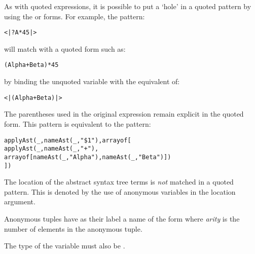 As with quoted expressions, it is possible to put a `hole' in a quoted pattern by using the  or  forms. For example, the pattern:
\begin{alltt}
<| ?A * 45 |>
\end{alltt}
will match with a quoted form such as:
\begin{alltt}
(Alpha+Beta)*45
\end{alltt}
by binding the unquoted variable  with the equivalent of:
\begin{alltt}
<| (Alpha+Beta) |>
\end{alltt}
\begin{aside}
The parentheses used in the original expression remain explicit in the quoted form. This pattern is equivalent to the pattern:
\begin{alltt}
applyAst(\_, nameAst(\_, "\$1"), array of [
  applyAst(\_, nameAst(\_, "+"),
    array of [nameAst(\_,"Alpha"), nameAst(\_,"Beta")])
  ])
\end{alltt}
\begin{aside}
The location of the abstract syntax tree terms is \emph{not} matched in a quoted pattern. This is denoted by the use of anonymous variables in the location argument.
\end{aside}
\begin{aside}
Anonymous tuples have as their label a name of the form  where \emph{arity} is the number of elements in the anonymous tuple.
\end{aside}
\end{aside}
The type of the variable  must also be .

